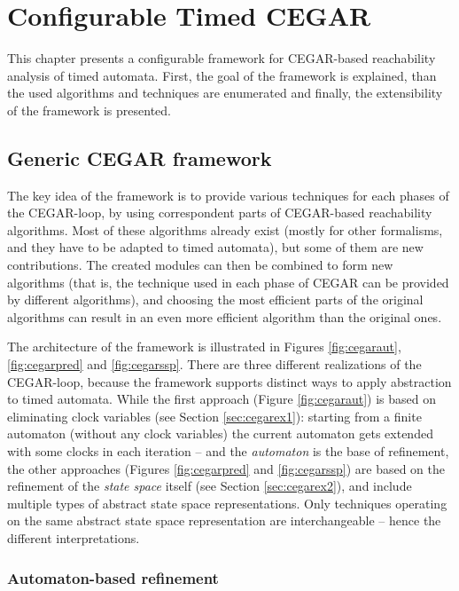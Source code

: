 \chapter{Configurable Timed CEGAR} \label{chap:timed_cegar}

This chapter presents a configurable framework for CEGAR-based reachability analysis of timed automata. First, the goal of the framework is explained, than the used algorithms and techniques are enumerated and finally, the extensibility of the framework is presented. 

\section{Generic CEGAR framework}

The key idea of the framework is to provide various techniques for each phases of the CEGAR-loop, by using correspondent parts of CEGAR-based reachability algorithms. Most of these algorithms already exist (mostly for other formalisms, and they have to be adapted to timed automata), but some of them are new contributions. The created modules can then be combined to form new algorithms (that is, the technique used in each phase of CEGAR can be provided by different algorithms), and choosing the most efficient parts of the original algorithms can result in an even more efficient algorithm than the original ones. 

The architecture of the framework is illustrated in Figures \ref{fig:cegaraut}, \ref{fig:cegarpred} and \ref{fig:cegarssp}. There are three different realizations of the CEGAR-loop, because the framework supports distinct ways to apply abstraction to timed automata. While the first approach (Figure \ref{fig:cegaraut}) is based on eliminating clock variables (see Section \ref{sec:cegarex1}):  starting from a finite automaton (without any clock variables) the current automaton gets extended with some clocks in each iteration -- and the \emph{automaton} is the base of refinement, the other approaches (Figures \ref{fig:cegarpred} and \ref{fig:cegarssp}) are based on the refinement of the \emph{state space} itself (see Section \ref{sec:cegarex2}), and include multiple types of abstract state space representations. Only techniques operating on the same abstract state space representation are interchangeable -- hence the different interpretations.

\subsection{Automaton-based refinement}

